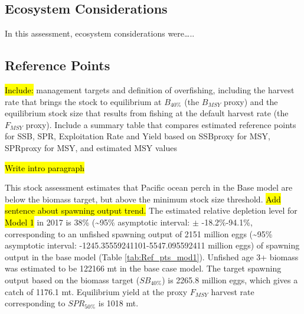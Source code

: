 \documentclass[12pt,]{article}
\begin{document}
\FloatBarrier

\subsection*{Ecosystem Considerations}\label{ecosystem-considerations}

In this assessment, ecosystem considerations were\ldots{}..

\subsection*{Reference Points}\label{reference-points}

\hl{Include:} management targets and definition of overfishing,
including the harvest rate that brings the stock to equilibrium at
\(B_{40\%}\) (the \(B_{MSY}\) proxy) and the equilibrium stock size that
results from fishing at the default harvest rate (the \(F_{MSY}\)
proxy). Include a summary table that compares estimated reference points
for SSB, SPR, Exploitation Rate and Yield based on SSBproxy for MSY,
SPRproxy for MSY, and estimated MSY values

\hl{Write intro paragraph}

This stock assessment estimates that Pacific ocean perch in the Base
model are below the biomass target, but above the minimum stock size
threshold. \hl{Add sentence about spawning output trend.} The estimated
relative depletion level for \hl{Model 1} in 2017 is 38\%
(\textasciitilde{}95\% asymptotic interval: \(\pm\) -18.2\%-94.1\%,
corresponding to an unfished spawning output of 2151 million eggs
(\textasciitilde{}95\% asymptotic interval:
-1245.35559241101-5547.095592411 million eggs) of spawning output in the
base model (Table \ref{tab:Ref_pts_mod1}). Unfished age 3+ biomass was
estimated to be 122166 mt in the base case model. The target spawning
output based on the biomass target (\(SB_{40\%}\)) is 2265.8 million
eggs, which gives a catch of 1176.1 mt. Equilibrium yield at the proxy
\(F_{MSY}\) harvest rate corresponding to \(SPR_{50\%}\) is 1018 mt.

\FloatBarrier
\end{document}
